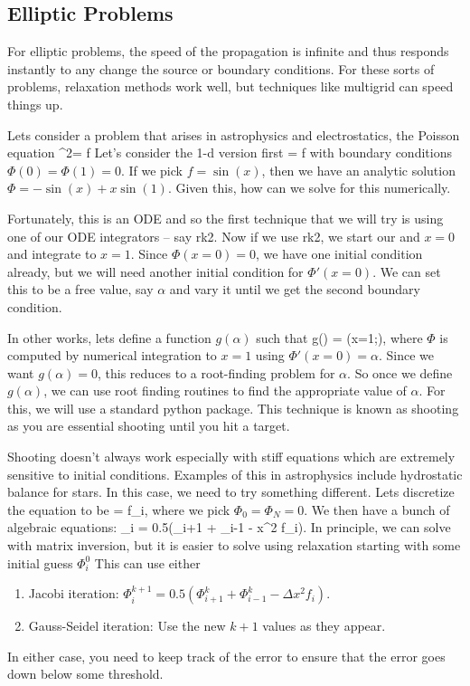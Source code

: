 \subsection{Elliptic Problems}

For elliptic problems, the speed of the propagation is infinite and thus responds instantly to any change the source or boundary conditions. For these sorts of problems, relaxation methods work well, but techniques like multigrid can speed things up. 

Lets consider a problem that arises in astrophysics and electrostatics, the Poisson equation
\be
\nabla^2\Phi = f
\ee
Let's consider the 1-d version first 
\be
\dddx\Phi = f
\ee
with boundary conditions $\Phi(0) = \Phi(1) = 0$.  If we pick $f=\sin(x)$, then we have an analytic solution $\Phi = -\sin(x) +x\sin(1)$.  Given this, how can we solve for this numerically.  

Fortunately, this is an ODE and so the first technique that we will try is using one of our ODE integrators -- say rk2.  Now if we use rk2, we start our and $x=0$ and integrate to $x=1$.  Since $\Phi(x=0) = 0$, we have one initial condition already, but we will need another initial condition for $\Phi'(x=0)$.  We can set this to be a free value, say $\alpha$ and vary it until we get the second boundary condition.  

In other works, lets define a function $g(\alpha)$ such that
\be
g(\alpha) = \Phi(x=1;\alpha),
\ee
where $\Phi$ is computed by numerical integration to $x=1$ using $\Phi'(x=0) = \alpha$.  Since we want $g(\alpha) = 0$, this reduces to a root-finding problem for $\alpha$.  So once we define $g(\alpha)$, we can use root finding routines to find the appropriate value of $\alpha$.  For this, we will use a standard python package. This technique is known as shooting as you are essential shooting until you hit a target.  



Shooting doesn't always work especially with stiff equations which are extremely sensitive to initial conditions.  Examples of this in astrophysics include hydrostatic balance for stars.  In this case, we need to try something different.  Lets discretize the equation to be
\be
{} = f_i,
\ee
where we pick $\Phi_0 = \Phi_N = 0$.  We then have a bunch of algebraic equations:
\be
\Phi_i = 0.5\left(\Phi_{i+1} + \Phi_{i-1} - \Delta x^2 f_i\right).
\ee
In principle, we can solve with matrix inversion, but it is easier to solve using relaxation starting with some initial guess $\Phi_i^0$  This can use either 
\begin{enumerate}
    \item Jacobi iteration: $\Phi_i^{k+1} = 0.5\left(\Phi_{i+1}^k + \Phi_{i-1}^k - \Delta x^2 f_i\right).$
    \item Gauss-Seidel iteration: Use the new $k+1$ values as they appear. 
\end{enumerate}
In either case, you need to keep track of the error to ensure that the error goes down below some threshold. 

